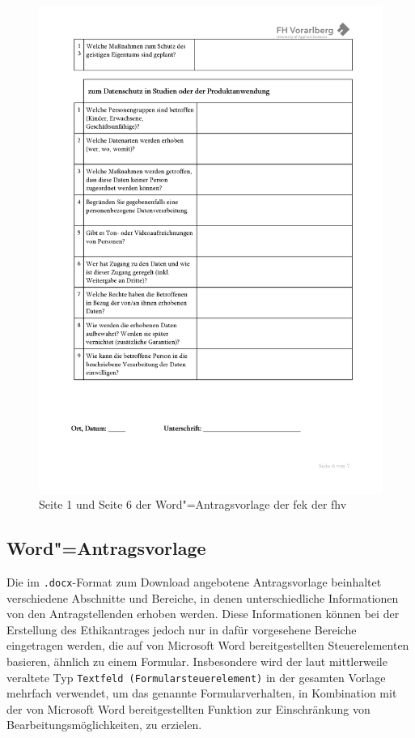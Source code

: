 \documentclass[a4paper,12pt,twoside]{scrreprt}
\begin{document}
\begin{figure}[ht]
\begin{minipage}[b]{.49\linewidth}
        \includegraphics[width=\linewidth]{thesis/images/Luidold_Word-Vorlage-FHV-2.png}
    \end{minipage}
    \caption[{Seite 1 und Seite 6 der Word"=Antragsvorlage der \acl{fek} der \acl{fhv}}]{Seite 1 und Seite 6 der Word"=Antragsvorlage der \acl{fek} der \acl{fhv} \cite{fachhochschule_vorarlberg_gmbh_forschungsethik-kommission_2021}}
    \label{fig:dokumentenvorlage-fek}
\end{figure}

\subsection{Word"=Antragsvorlage}
\label{sub-sec:technischer-aufbau-word-antragsvorlage}

Die im \texttt{.docx}-Format zum Download angebotene Antragsvorlage beinhaltet verschiedene Abschnitte und Bereiche, in denen unterschiedliche Informationen von den Antragstellenden erhoben werden. Diese Informationen können bei der Erstellung des Ethikantrages jedoch nur in dafür vorgesehene Bereiche eingetragen werden, die auf von Microsoft Word bereitgestellten Steuerelementen basieren, ähnlich zu einem Formular. Insbesondere wird der laut \cite{ay_textfelder_2023} mittlerweile veraltete Typ \texttt{Textfeld (Formularsteuerelement)} in der gesamten Vorlage mehrfach verwendet, um das genannte Formularverhalten, in Kombination mit der von Microsoft Word bereitgestellten Funktion zur Einschränkung von Bearbeitungsmöglichkeiten, zu erzielen.
\end{document}
